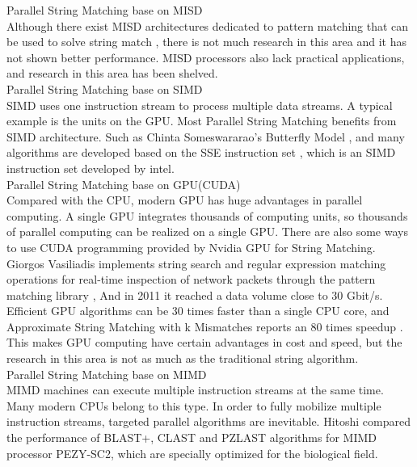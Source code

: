 \documentclass[11pt]{article}       %
\begin{document}
Parallel String Matching base on MISD\\
Although there exist MISD architectures dedicated to pattern matching that can be used to solve string match \cite{MISD}, there is not much research in this area and it has not shown better performance. MISD processors also lack practical applications, and research in this area has been shelved. \\

Parallel String Matching base on SIMD\\
SIMD uses one instruction stream to process multiple data streams. A typical example is the units on the GPU. Most Parallel String Matching benefits from SIMD architecture. Such as Chinta Someswararao's Butterfly Model \cite{Butterfly}, and many algorithms are developed based on the SSE instruction set \cite{Matching}, which is an SIMD instruction set developed by intel. \\

Parallel String Matching base on GPU(CUDA)\\
Compared with the CPU, modern GPU has huge advantages in parallel computing. A single GPU integrates thousands of computing units, so thousands of parallel computing can be realized on a single GPU. There are also some ways to use CUDA programming provided by Nvidia GPU for String Matching. Giorgos Vasiliadis implements string search and regular expression matching operations for real-time inspection of network packets through the pattern matching library \cite{Bit-Parallel}, And in 2011 it reached a data volume close to 30 Gbit/s. Efficient GPU algorithms can be 30 times faster than a single CPU core, and Approximate String Matching with k Mismatches reports an 80 times speedup \cite{pattern-matching}. This makes GPU computing have certain advantages in cost and speed, but the research in this area is not as much as the traditional string algorithm. \\

Parallel String Matching base on MIMD\\
MIMD machines can execute multiple instruction streams at the same time. Many modern CPUs belong to this type. In order to fully mobilize multiple instruction streams, targeted parallel algorithms are inevitable. Hitoshi compared the performance of BLAST+, CLAST and PZLAST algorithms for MIMD processor PEZY-SC2\cite{MIMD}, which are specially optimized for the biological field.\\
\end{document}
